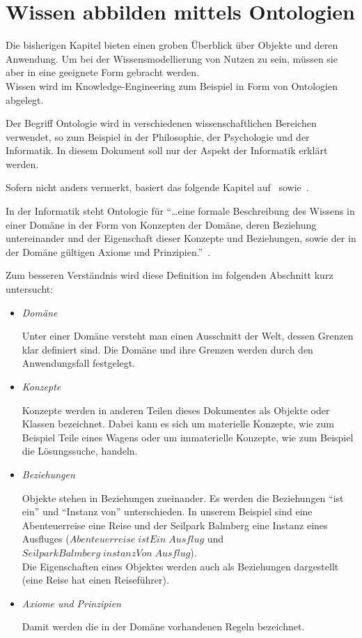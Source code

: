 \chapter{Wissen abbilden mittels Ontologien}
\label{chap:ontologien}

Die bisherigen Kapitel bieten einen groben Überblick über Objekte und deren Anwendung. Um bei der Wissensmodellierung von Nutzen zu sein, müssen sie aber in eine geeignete Form gebracht werden.\\
Wissen wird im Knowledge-Engineering zum Beispiel in Form von Ontologien abgelegt.

Der Begriff Ontologie wird in verschiedenen wissenschaftlichen Bereichen verwendet, so zum Beispiel in der Philosophie, der Psychologie und der Informatik. In diesem Dokument soll nur der Aspekt der Informatik erklärt werden.

Sofern nicht anders vermerkt, basiert das folgende Kapitel auf~\cite{IspekOntoBedeutung} sowie~\cite{ISpekOntoGeschichte}.

In der Informatik steht Ontologie für ``\ldots eine formale Beschreibung des Wissens in einer Domäne in der Form von Konzepten der Domäne, deren Beziehung untereinander und der Eigenschaft dieser Konzepte und Beziehungen, sowie der in der Domäne gültigen Axiome und Prinzipien.''~\cite[S. 310]{ISpekOntoGeschichte}.

Zum besseren Verständnis wird diese Definition im folgenden Abschnitt kurz untersucht:
\begin{itemize}
    \item \textit{Domäne}

        Unter einer Domäne versteht man einen Ausschnitt der Welt, dessen Grenzen klar definiert sind. Die Domäne und ihre Grenzen werden durch den Anwendungsfall festgelegt.

    \item \textit{Konzepte}

        Konzepte werden in anderen Teilen dieses Dokumentes als Objekte oder Klassen bezeichnet. Dabei kann es sich um materielle Konzepte, wie zum Beispiel Teile eines Wagens oder um immaterielle Konzepte, wie zum Beispiel die Lösungssuche, handeln.

    \item \textit{Beziehungen}

        Objekte stehen in Beziehungen zueinander. Es werden die Beziehungen ``ist ein'' und ``Instanz von'' unterschieden. In unserem Beispiel sind eine Abenteuerreise eine Reise und der Seilpark Balmberg eine Instanz eines Ausfluges ($Abenteuerreise\;istEin\;Ausflug$ und $SeilparkBalmberg\;instanzVon\;Ausflug$).\\
        Die Eigenschaften eines Objektes werden auch als Beziehungen dargestellt (eine Reise hat einen Reiseführer).

    \item \textit{Axiome und Prinzipien}

        Damit werden die in der Domäne vorhandenen Regeln bezeichnet.
\end{itemize}

